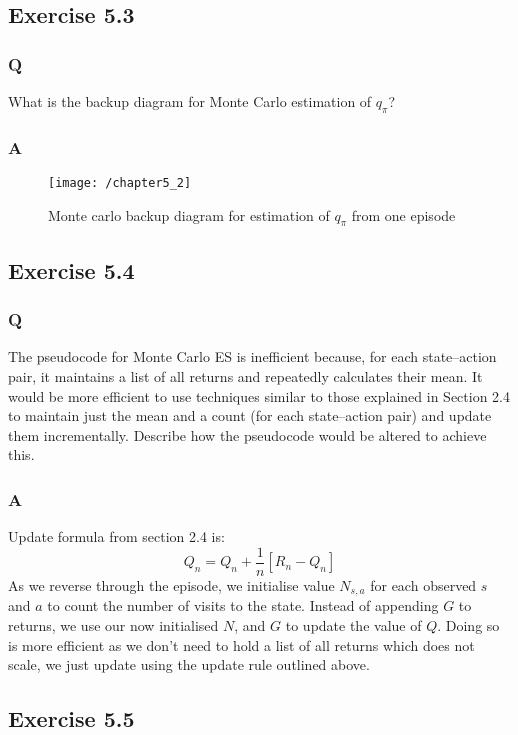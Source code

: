 \subsection{Exercise 5.3}
\subsubsection{Q}
What is the backup diagram for Monte Carlo estimation of $q_\pi$?
\subsubsection{A}
\begin{figure}[h!]
	\centering
	\texttt{[image: /chapter5\_2]}
	\caption{Monte carlo backup diagram for estimation of $q_\pi$ from one episode}
	\label{fig:monte carlo qpi}
\end{figure}

\subsection{Exercise 5.4}
\subsubsection{Q}
The pseudocode for Monte Carlo ES is inefficient because, for each state–action pair, it maintains a list of all returns and repeatedly calculates their mean. It would be more efficient to use techniques similar to those explained in Section 2.4 to maintain just the mean and a count (for each state–action pair) and update them incrementally. Describe how the pseudocode would be altered to achieve this.
\subsubsection{A}
Update formula from section 2.4 is:
\begin{equation}
	Q_n = Q_n + \frac{1}{n}\left[R_n - Q_n\right]
\end{equation}
As we reverse through the episode, we initialise value $N_{s,a}$ for each observed $s$ and $a$ to count the number of visits to the state. Instead of appending $G$ to returns, we use our now initialised $N$, and $G$ to update the value of $Q$. Doing so is more efficient as we don't need to hold a list of all returns which does not scale, we just update using the update rule outlined above.

\subsection{Exercise 5.5}
